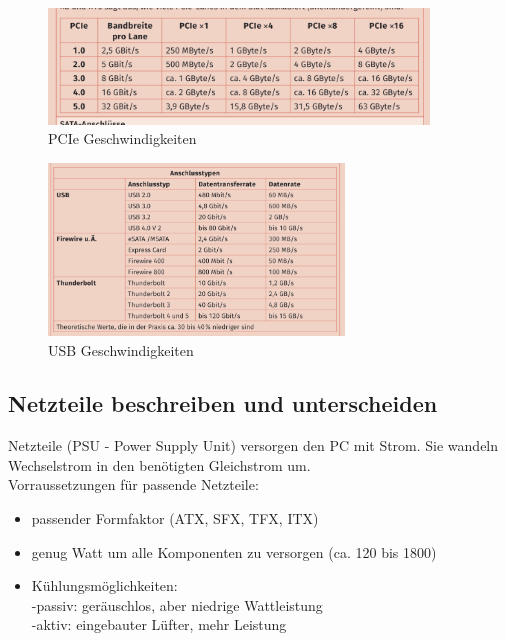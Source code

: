     \begin{figure}[ht]
        \centering
        \includegraphics[width=0.9\textwidth]{./images/2.4.5_pciespeeds.png}
        \caption{PCIe Geschwindigkeiten}\label{fig:PCIe Geschwindigkeiten}
    \end{figure}

    \begin{figure}[ht]
        \centering
        \includegraphics[width=0.7\textwidth]{./images/2.4.5_usbspeed.png}
        \caption{USB Geschwindigkeiten}\label{fig:USB Geschwindigkeiten}
    \end{figure}

\newpage
\subsection{Netzteile beschreiben und unterscheiden}
    \begin{subindent}
        Netzteile (PSU - Power Supply Unit) versorgen den PC mit Strom. Sie wandeln Wechselstrom in den benötigten Gleichstrom um. \\
        Vorraussetzungen für passende Netzteile:
    \end{subindent}

    \begin{itemize}[leftmargin=2.5cm, topsep=0.2em, itemsep=0.1em, parsep=0.3em]
        \item passender Formfaktor (ATX, SFX, TFX, ITX)
        \item genug Watt um alle Komponenten zu versorgen (ca. 120 bis 1800)
        \item Kühlungsmöglichkeiten\@: \\ -passiv: geräuschlos, aber niedrige Wattleistung \\ -aktiv: eingebauter Lüfter, mehr Leistung
    \end{itemize}

